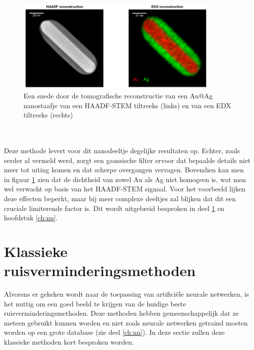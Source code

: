 \documentclass{report}
\begin{document}
\begin{figure}[h!]
	\centering
	\includegraphics[width=10cm]{images/tem/reconstruction.png}
	\caption{Een snede door de tomografische reconstructie van een Au@Ag nanostaafje van een HAADF-STEM tiltreeks (links) en van een EDX tiltreeks (rechts)}
	\label{fig:tem_reconstruction}
\end{figure}
\\ \\
Deze methode levert voor dit nanodeeltje degelijke resultaten op. Echter, zoals eerder al vermeld werd, zorgt een gaussische filter ervoor dat bepaalde details niet meer tot uiting komen en dat scherpe overgangen vervagen. Bovendien kan men in figuur \ref{fig:tem_reconstruction} zien dat de dichtheid van zowel Au als Ag niet homogeen is, wat men wel verwacht op basis van het HAADF-STEM signaal. Voor het voorbeeld lijken deze effecten beperkt, maar bij meer complexe deeltjes zal blijken dat dit een cruciale limiterende factor is. Dit wordt uitgebreid besproken in deel \ref{ch:class} en hoofdstuk \ref{ch:nn}.

\section{Klassieke ruisverminderingsmethoden} \label{ch:class}
Alvorens er gekeken wordt naar de toepassing van artificiële neurale netwerken, is het nuttig om een goed beeld te krijgen van de huidige beste ruisverminderingsmethoden. Deze methoden hebben gemeenschappelijk dat ze meteen gebruikt kunnen worden en niet zoals neurale netwerken getraind moeten worden op een grote database (zie deel \ref{ch:nn}). In deze sectie zullen deze klassieke methoden kort besproken worden.
\end{document}
